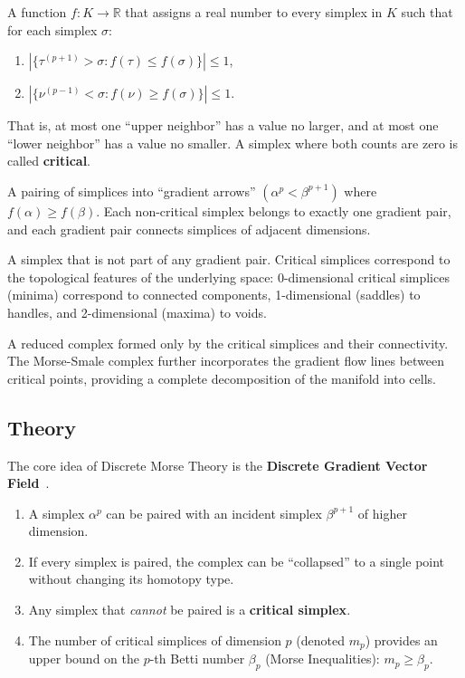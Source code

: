 \begin{definition}\label{def:discrete_morse_function}
A function $f \colon K \to \mathbb{R}$ that assigns a real number to every simplex in $K$ such that for each simplex $\sigma$:
\begin{enumerate}
    \item $|\{\tau^{(p+1)} > \sigma : f(\tau) \le f(\sigma)\}| \le 1$,
    \item $|\{\nu^{(p-1)} < \sigma : f(\nu) \ge f(\sigma)\}| \le 1$.
\end{enumerate}
That is, at most one ``upper neighbor'' has a value no larger, and at most one ``lower neighbor'' has a value no smaller. A simplex where both counts are zero is called \textbf{critical}.
\end{definition}

\begin{definition}\label{def:gradient_vector_field}
A pairing of simplices into ``gradient arrows'' $(\alpha^p < \beta^{p+1})$ where $f(\alpha) \ge f(\beta)$. Each non-critical simplex belongs to exactly one gradient pair, and each gradient pair connects simplices of adjacent dimensions.
\end{definition}

\begin{definition}\label{def:critical_simplex}
A simplex that is not part of any gradient pair. Critical simplices correspond to the topological features of the underlying space: 0-dimensional critical simplices (minima) correspond to connected components, 1-dimensional (saddles) to handles, and 2-dimensional (maxima) to voids.
\end{definition}

\begin{definition}\label{def:morse_complex}
A reduced complex formed only by the critical simplices and their connectivity. The Morse-Smale complex further incorporates the gradient flow lines between critical points, providing a complete decomposition of the manifold into cells.
\end{definition}

\subsection{Theory}
The core idea of Discrete Morse Theory is the \textbf{Discrete Gradient Vector Field}~\cite{forman1998}.
\begin{enumerate}
    \item A simplex $\alpha^p$ can be paired with an incident simplex $\beta^{p+1}$ of higher dimension.
    \item If every simplex is paired, the complex can be ``collapsed'' to a single point without changing its homotopy type.
    \item Any simplex that \emph{cannot} be paired is a \textbf{critical simplex}.
    \item The number of critical simplices of dimension $p$ (denoted $m_p$) provides an upper bound on the $p$-th Betti number $\beta_p$ (Morse Inequalities): $m_p \ge \beta_p$.
\end{enumerate}


